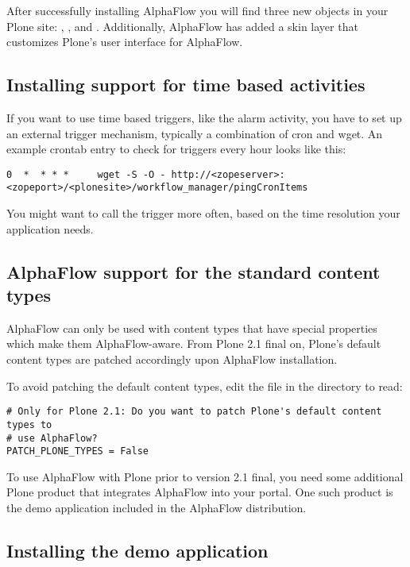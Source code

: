 After successfully installing AlphaFlow you will find three new objects in
your Plone site: , , and
. Additionally, AlphaFlow has added a skin layer that
customizes Plone's user interface for AlphaFlow.

\subsection{Installing support for time based activities}

If you want to use time based triggers, like the alarm activity,  you have to
set up an external trigger mechanism, typically a combination of cron and wget.
An example crontab entry to check for triggers every hour looks like this:

\begin{verbatim}
0  *  * * *     wget -S -O - http://<zopeserver>:<zopeport>/<plonesite>/workflow_manager/pingCronItems
\end{verbatim}

You might want to call the trigger more often, based on the time resolution your application needs.

\subsection{AlphaFlow support for the standard content types}
\label{sec:install-patch}

AlphaFlow can only be used with content types that have special properties
which make them AlphaFlow-aware. From Plone 2.1 final on, Plone's default
content types are patched accordingly upon AlphaFlow installation.

To avoid patching the default content types, edit the file
 in the  directory to read:

\begin{verbatim}
# Only for Plone 2.1: Do you want to patch Plone's default content types to
# use AlphaFlow?
PATCH_PLONE_TYPES = False
\end{verbatim}

To use AlphaFlow with Plone prior to version 2.1 final, you need some
additional Plone product that integrates AlphaFlow into your portal. One such
product is the demo application included in the AlphaFlow distribution.

\subsection{Installing the demo application}

